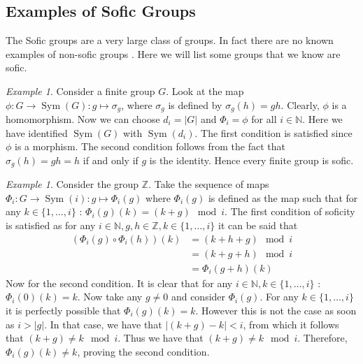 \documentclass[titlepage, a4paper]{article}
\newcommand{\N}{\mathbb{N}}
\newcommand{\Z}{\mathbb{Z}}
\newcommand{\card}[1]{\left| #1 \right|}
\DeclareMathOperator{\sym}{Sym}
\theoremstyle{remark}
\newtheorem{example}[theorem]{Example}
\begin{document}
    \subsection{Examples of Sofic Groups}
    The Sofic groups are a very large class of groups. 
    In fact there are no known examples of non-sofic groups \cite[Introduction]{weiss_2000}. 
    Here we will list some groups that we know are sofic.
    
    
    \begin{example}\label{ex:finite_group_sofic}
    Consider a finite group $G$. Look at the map $\phi: G \to \sym(G): g \mapsto \sigma_g$, where $\sigma_g$ is defined by $\sigma_g(h) = gh$. Clearly, $\phi$ is a homomorphism. Now we can choose $d_i = \card G$ and $\Phi_i = \phi$ for all $i \in \N$. Here we have identified $\sym(G)$ with $\sym(d_i)$. The first condition is satisfied since $\phi$ is a morphism. The second condition follows from the fact that $\sigma_g(h) = gh = h$ if and only if $g$ is the identity.
     Hence every finite group is sofic.
    \end{example}


	\begin{example}\label{ex:Z}
	Consider the group $\Z$. Take the sequence of maps $\Phi_{i}: G \to \sym(i): g \mapsto \Phi_{i}(g)$ where $\Phi_{i}(g)$ is defined as the map such that for any $k \in \{1,\dots,i\}$ : $ \Phi_{i}(g)(k) = (k+g) \mod i$. The first condition of soficity is satisfied as for any $i \in \N, g,h \in \Z, k \in \{1,\dots, i\}$ it can be said that 
	\begin{align*}
	(\Phi_{i}(g) \circ \Phi_{i}(h))(k) &= (k+h+g)\mod i \\
	&= (k+g+h)\mod i \\
	&= \Phi_{i}(g+h)(k)
\end{align*}		
Now for the second condition. It is clear that for any $i \in \N, k \in \{1,\dots, i\}$ : $\Phi_{i}(0)(k) = k$. Now take any $g \neq 0$ and consider $\Phi_{i}(g)$. For any $k \in \{1,\dots,i\}$ it is perfectly possible that $\Phi_{i}(g)(k) = k$. However this is not the case as soon as $i > |g|$. In that case, we have that $|(k+g)-k| < i$, from which it follows that $(k+g) \neq k \mod i$. Thus we have that $(k+g) \neq k \mod i$. Therefore, $\Phi_{i}(g)(k) \neq k$, proving the second condition. 
	\end{example}
\end{document}
